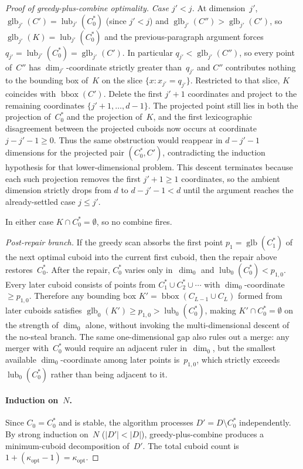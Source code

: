 \documentclass[manuscript,screen,review]{acmart}
\theoremstyle{definition}
\theoremstyle{plain}
\begin{document}
\begin{proof}[Proof of greedy-plus-combine optimality]
\emph{Case $j' < j$.}
At dimension~$j'$, $\operatorname{glb}_{j'}(C') = \operatorname{lub}_{j'}(C^*_0)$ (since $j' < j$) and $\operatorname{glb}_{j'}(C'') > \operatorname{glb}_{j'}(C')$, so $\operatorname{glb}_{j'}(K) = \operatorname{lub}_{j'}(C^*_0)$ and the previous-paragraph argument forces $q_{j'} = \operatorname{lub}_{j'}(C^*_0) = \operatorname{glb}_{j'}(C')$.  In particular $q_{j'} < \operatorname{glb}_{j'}(C'')$, so every point of~$C''$ has $\dim_{j'}$-coordinate strictly greater than~$q_{j'}$ and $C''$ contributes nothing to the bounding box of~$K$ on the slice $\{x : x_{j'} = q_{j'}\}$.  Restricted to that slice, $K$ coincides with $\operatorname{bbox}(C')$.  Delete the first $j'{+}1$ coordinates and project to the remaining coordinates $\{j'{+}1, \ldots, d{-}1\}$.  The projected point still lies in both the projection of~$C^*_0$ and the projection of~$K$, and the first lexicographic disagreement between the projected cuboids now occurs at coordinate $j - j' - 1 \geq 0$.  Thus the same obstruction would reappear in $d - j' - 1$ dimensions for the projected pair $(C^*_0, C')$, contradicting the induction hypothesis for that lower-dimensional problem.
This descent terminates because each such projection removes the first $j'{+}1 \geq 1$ coordinates, so the ambient dimension strictly drops from $d$ to $d - j' - 1 < d$ until the argument reaches the already-settled case $j \leq j'$.

In either case $K \cap C^*_0 = \emptyset$, so no combine fires.

\emph{Post-repair branch.}
If the greedy scan absorbs the first point $p_1 = \operatorname{glb}(C^*_1)$ of the next optimal cuboid into the current first cuboid, then the repair above restores~$C^*_0$.  After the repair, $C^*_0$ varies only in~$\dim_0$ and $\operatorname{lub}_0(C^*_0) < p_{1,0}$.  Every later cuboid consists of points from $C^*_1 \cup C^*_2 \cup \cdots$ with $\dim_0$-coordinate $\geq p_{1,0}$.  Therefore any bounding box $K' = \operatorname{bbox}(C_{L-1} \cup C_L)$ formed from later cuboids satisfies $\operatorname{glb}_0(K') \geq p_{1,0} > \operatorname{lub}_0(C^*_0)$, making $K' \cap C^*_0 = \emptyset$ on the strength of $\dim_0$ alone, without invoking the multi-dimensional descent of the no-steal branch.  The same one-dimensional gap also rules out a merge: any merger with~$C^*_0$ would require an adjacent ruler in~$\dim_0$, but the smallest available $\dim_0$-coordinate among later points is~$p_{1,0}$, which strictly exceeds $\operatorname{lub}_0(C^*_0)$ rather than being adjacent to it.

\paragraph{Induction on~$N$.}
Since $C_0 = C^*_0$ and is stable, the algorithm processes
$D' = D \setminus C^*_0$ independently. By strong induction on~$N$
($|D'| < |D|$), greedy-plus-combine produces a minimum-cuboid
decomposition of~$D'$. The total cuboid count is
$1 + (\kappa_{\text{opt}} - 1) = \kappa_{\text{opt}}$.
\end{proof}



\end{document}
